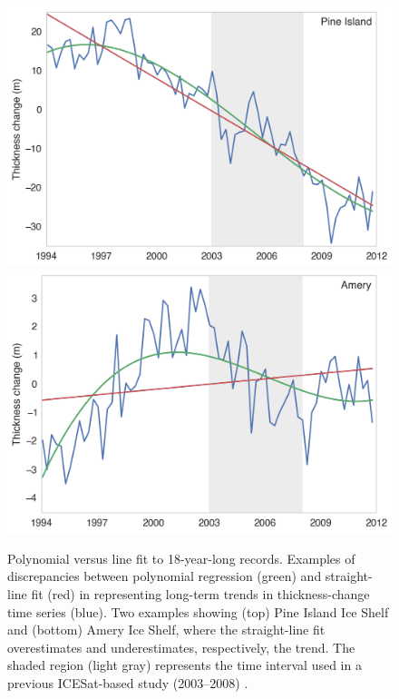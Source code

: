 \begin{figure}[!h]
  \centering
  \includegraphics[width=.74\textwidth]{img/ts_pig_v2.png}\\
  \includegraphics[width=.74\textwidth]{img/ts_amery_v2.png}
  \caption[Polynomial versus line fit to 18-year-long records]{
Polynomial versus line fit to 18-year-long records. Examples of discrepancies between polynomial regression (green) and straight-line fit (red) in representing long-term trends in thickness-change time series (blue). Two examples showing (top) Pine Island Ice Shelf and (bottom) Amery Ice Shelf, where the straight-line fit overestimates and underestimates, respectively, the trend. The shaded region (light gray) represents the time interval used in a previous ICESat-based study (2003--2008) \parencite{Pritchard2012}.
  }
  \label{c3f7}
\end{figure}


